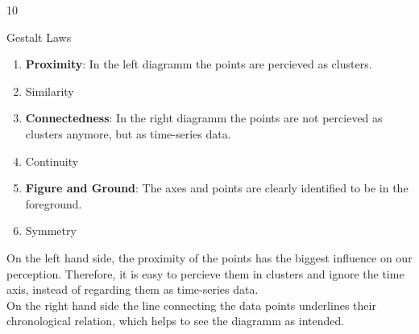 \documentclass{article}
\begin{document}
    \begin{ukon-infie}[24.01.18]{10}

        \begin{exercise}[p=6]{Gestalt Laws}  
        \question{}
        {
      	\begin{enumerate}
      	\item \textbf{Proximity}: In the left diagramm the points are percieved as clusters.
      	\item Similarity
      	\item \textbf{Connectedness}: In the right diagramm the points are not  percieved as clusters anymore, but as time-series data.
      	\item Continuity
      	\item \textbf{Figure and Ground}: The axes and points are clearly identified to be in the foreground.
      	\item Symmetry
      	\end{enumerate}
      	}
      	
      	\question{}
      	{
      		On the left hand side, the proximity of the points has the biggest influence on our perception. Therefore, it is easy to percieve them in clusters and ignore the time axis, instead of regarding them as time-series data.\\
      		On the right hand side the line connecting the data points underlines their chronological relation, which helps to see the diagramm as intended.
      	}
		\end{exercise}
		

\end{ukon-infie}
\end{document}
